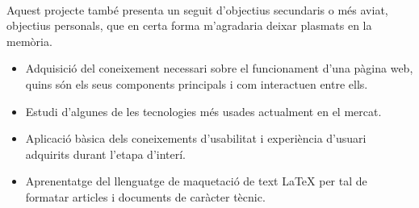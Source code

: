     \paragraph{}
    Aquest projecte també presenta un seguit d’objectius secundaris o més aviat, objectius personals, que en certa forma m’agradaria deixar plasmats en la memòria.

    \begin{itemize}
        \item Adquisició del coneixement necessari sobre el funcionament d'una pàgina web, quins són els seus components principals i com interactuen entre ells.
        \item Estudi d'algunes de les tecnologies més usades actualment en el mercat.
        \item Aplicació bàsica dels coneixements d’usabilitat i experiència d’usuari adquirits durant l’etapa d’interí.
        \item Aprenentatge del llenguatge de maquetació de text LaTeX per tal de formatar articles i documents de caràcter tècnic.
    \end{itemize}
